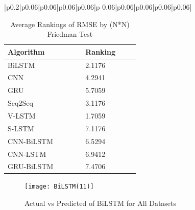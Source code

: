\begin{landscape}
{\begin{longtable}{|p{0.2\linewidth}|p{0.06\linewidth}|p{0.06\linewidth}|p{0.06\linewidth}|p{0.06\linewidth}|p
        {0.06\linewidth}|p{0.06\linewidth}|p{0.06\linewidth}|p{0.06\linewidth}|p{0.06\linewidth}|}
\end{longtable}}
\end{landscape}


\begin{table}[!htp]
\centering
\setlength{\tabcolsep}{3pt}
{\renewcommand{\arraystretch}{1}%
    \caption{Average Rankings of RMSE by (N*N) Friedman Test}
\label{tab:RMSE_Rnk}
\begin{tabular}{|p{0.2\linewidth}|p{0.1\linewidth}|}
\hline
Algorithm&Ranking\\\hline
BiLSTM & 2.1176\\ \hline
CNN & 4.2941\\\hline
GRU & 5.7059\\\hline
Seq2Seq & 3.1176\\\hline
V-LSTM & 1.7059\\\hline
S-LSTM & 7.1176\\\hline
CNN-BiLSTM & 6.5294\\\hline
CNN-LSTM & 6.9412\\\hline
GRU-BiLSTM & 7.4706\\\hline
\end{tabular}}

\end{table}

\pagebreak
\begin{figure}[H]
    \centering
    \texttt{[image: BiLSTM(11)]}
    \caption{Actual vs Predicted of BiLSTM for All Datasets}
    \label{img:bilstn_a_p}
\end{figure}

